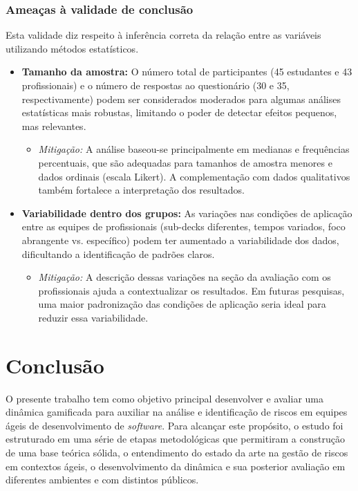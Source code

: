 \documentclass[
	12pt,
	openright,
	twoside,
	a4paper,
	english,
	brazil
	]{abntex2}
\begin{document}
\subsection{Ameaças à validade de conclusão}
\label{sec:ameacas-estatistica}

Esta validade diz respeito à inferência correta da relação entre as variáveis utilizando métodos estatísticos.

\begin{itemize}
  \item \textbf{Tamanho da amostra:} O número total de participantes (45 estudantes e 43 profissionais) e o número de respostas ao questionário (30 e 35, respectivamente) podem ser considerados moderados para algumas análises estatísticas mais robustas, limitando o poder de detectar efeitos pequenos, mas relevantes.
    \begin{itemize}
    \item \textit{Mitigação:} A análise baseou-se principalmente em medianas e frequências percentuais, que são adequadas para tamanhos de amostra menores e dados ordinais (escala Likert). A complementação com dados qualitativos também fortalece a interpretação dos resultados.
    \end{itemize}
  \item \textbf{Variabilidade dentro dos grupos:} As variações nas condições de aplicação entre as equipes de profissionais (sub-decks diferentes, tempos variados, foco abrangente vs. específico) podem ter aumentado a variabilidade dos dados, dificultando a identificação de padrões claros.
    \begin{itemize}
    \item \textit{Mitigação:} A descrição dessas variações na seção da avaliação com os profissionais ajuda a contextualizar os resultados. Em futuras pesquisas, uma maior padronização das condições de aplicação seria ideal para reduzir essa variabilidade.
    \end{itemize}
\end{itemize}


\chapter{Conclusão}
\label{cap:conclusao}

O presente trabalho tem como objetivo principal desenvolver e avaliar uma dinâmica gamificada para auxiliar na análise e identificação de riscos em equipes ágeis de desenvolvimento de \textit{software}. Para alcançar este propósito, o estudo foi estruturado em uma série de etapas metodológicas que permitiram a construção de uma base teórica sólida, o entendimento do estado da arte na gestão de riscos em contextos ágeis, o desenvolvimento da dinâmica e sua posterior avaliação em diferentes ambientes e com distintos públicos.
\end{document}
